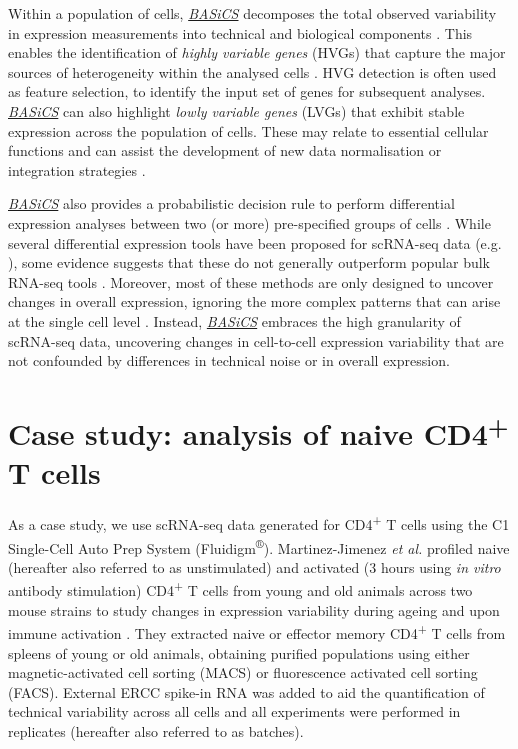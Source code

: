 \documentclass[9pt,a4paper,]{extarticle}
\begin{document}
Within a population of cells, \emph{\href{https://bioconductor.org/packages/3.11/BASiCS}{BASiCS}} decomposes the total
observed variability in expression measurements into technical and biological
components \citep{Vallejos2015}.
This enables the identification of \emph{highly variable genes} (HVGs) that capture
the major sources of heterogeneity within the analysed cells \citep{Brennecke2013}.
HVG detection is often used as feature selection, to identify the input
set of genes for subsequent analyses.
\emph{\href{https://bioconductor.org/packages/3.11/BASiCS}{BASiCS}} can also highlight \emph{lowly variable genes} (LVGs) that
exhibit stable expression across the population of cells.
These may relate to essential cellular functions and can assist the development
of new data normalisation or integration strategies \citep{Lin2019}.

\emph{\href{https://bioconductor.org/packages/3.11/BASiCS}{BASiCS}} also provides a probabilistic decision rule to
perform differential expression analyses between two (or more) pre-specified
groups of cells \citep{Vallejos2016, Eling2018}.
While several differential expression tools have been proposed for scRNA-seq
data (e.g. \citep{Kharchenko2014, Finak2015}), some evidence suggests that
these do not generally outperform popular bulk RNA-seq tools \citep{Soneson2018}.
Moreover, most of these methods are only designed to uncover changes in overall
expression, ignoring the more complex patterns that can arise at the single cell
level \citep{Lahnemann2020}.
Instead, \emph{\href{https://bioconductor.org/packages/3.11/BASiCS}{BASiCS}} embraces the high granularity of scRNA-seq data,
uncovering changes in cell-to-cell expression variability that are not
confounded by differences in technical noise or in overall expression.

\hypertarget{Tcells}{%
\section{\texorpdfstring{Case study: analysis of naive CD4\textsuperscript{+} T cells}{Case study: analysis of naive CD4+ T cells}}\label{Tcells}}

As a case study, we use scRNA-seq data generated for CD4\textsuperscript{+} T cells
using the C1 Single-Cell Auto Prep System (Fluidigm\textsuperscript{®}).
Martinez-Jimenez \emph{et al.} profiled naive (hereafter also referred to as
unstimulated) and activated (3 hours using \emph{in vitro} antibody stimulation)
CD4\textsuperscript{+} T cells from young and old animals across two mouse strains to study
changes in expression variability during ageing and upon immune activation
\citep{Martinez-jimenez2017}.
They extracted naive or effector memory CD4\textsuperscript{+} T cells from spleens of young or
old animals, obtaining purified populations using either magnetic-activated cell
sorting (MACS) or fluorescence activated cell sorting (FACS).
External ERCC spike-in RNA \citep{Rna2005} was added to aid the quantification of
technical variability across all cells and all experiments were performed in
replicates (hereafter also referred to as batches).
\end{document}

